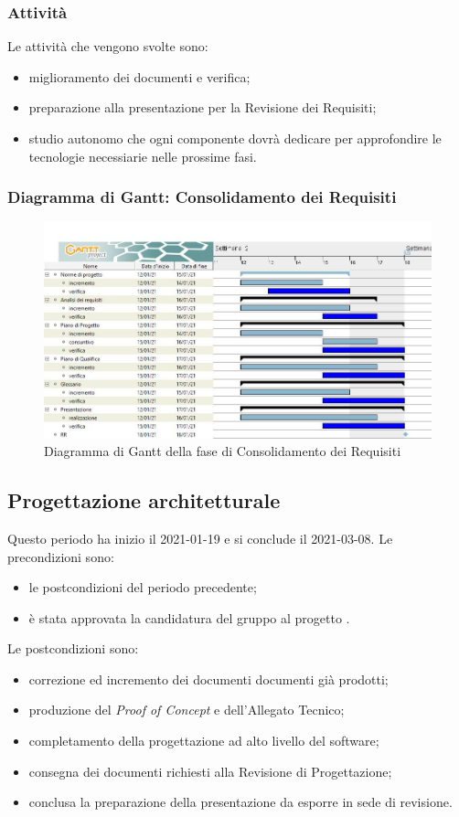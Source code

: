 \subsubsection{Attività}
Le attività che vengono svolte sono:
\begin{itemize}
	\item miglioramento dei documenti e verifica;
	\item preparazione alla presentazione per la Revisione dei Requisiti;
	\item studio autonomo che ogni componente dovrà dedicare per approfondire le tecnologie necessiarie nelle prossime fasi.
\end{itemize}
\subsubsection{Diagramma di Gantt: Consolidamento dei Requisiti}
\begin{figure}[H]
    \centering
    \includegraphics[scale = 0.4]{components/img/consolidamento_requisiti.jpg}
    \caption{Diagramma di Gantt della fase di Consolidamento dei Requisiti}
    \label{fig:Diagramma di Gantt, fase di Consolidamento dei Requisiti}
\end{figure}

\newpage
\subsection{Progettazione architetturale}
Questo periodo ha inizio il 2021-01-19 e si conclude il 2021-03-08.
Le precondizioni sono:
\begin{itemize}
	\item le postcondizioni del periodo precedente;
	\item è stata approvata la candidatura del gruppo al progetto \NomeProgetto.
\end{itemize}
Le postcondizioni sono:
\begin{itemize}
	\item correzione ed incremento dei documenti documenti già prodotti;
	\item produzione del \textit{Proof of Concept} e dell'Allegato Tecnico;
	\item completamento della progettazione ad alto livello del software;
	\item consegna dei documenti richiesti alla Revisione di Progettazione; 	
	\item conclusa la preparazione della presentazione da esporre in sede di revisione.
\end{itemize}
